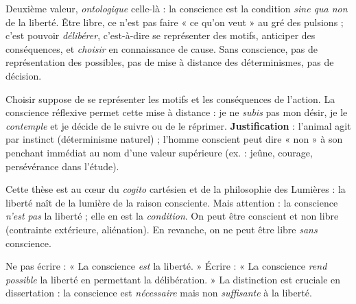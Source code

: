 \documentclass[11pt]{article}
\begin{document}
\noindent Deuxième valeur, \emph{ontologique} celle-là : la conscience est la condition \emph{sine qua non} de la liberté. Être libre, ce n'est pas faire « ce qu'on veut » au gré des pulsions ; c'est pouvoir \emph{délibérer}, c'est-à-dire se représenter des motifs, anticiper des conséquences, et \emph{choisir} en connaissance de cause. Sans conscience, pas de représentation des possibles, pas de mise à distance des déterminismes, pas de décision.

\begin{propriete}
Choisir suppose de se représenter les motifs et les conséquences de l'action. La conscience réflexive permet cette mise à distance : je ne \emph{subis} pas mon désir, je le \emph{contemple} et je décide de le suivre ou de le réprimer. \textbf{Justification} : l'animal agit par instinct (déterminisme naturel) ; l'homme conscient peut dire « non » à son penchant immédiat au nom d'une valeur supérieure (ex. : jeûne, courage, persévérance dans l'étude).
\end{propriete}

\noindent Cette thèse est au cœur du \emph{cogito} cartésien et de la philosophie des Lumières : la liberté naît de la lumière de la raison consciente. Mais attention : la conscience \emph{n'est pas} la liberté ; elle en est la \emph{condition}. On peut être conscient et non libre (contrainte extérieure, aliénation). En revanche, on ne peut être libre \emph{sans} conscience.

\begin{attention}
Ne pas écrire : « La conscience \emph{est} la liberté. » Écrire : « La conscience \emph{rend possible} la liberté en permettant la délibération. » La distinction est cruciale en dissertation : la conscience est \emph{nécessaire} mais non \emph{suffisante} à la liberté.
\end{attention}
\end{document}
